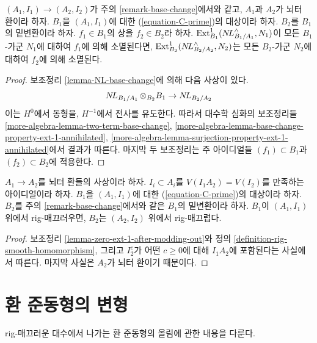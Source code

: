 \begin{lemma}
\label{lemma-zero-ext-1-after-modding-out}
$(A_1, I_1) \to (A_2, I_2)$가 주의 \ref{remark-base-change}에서와 같고,
$A_1$과 $A_2$가 뇌터 환이라 하자.
$B_1$을 $(A_1, I_1)$에 대한 (\ref{equation-C-prime})의 대상이라 하자.
$B_2$를 $B_1$의 밑변환이라 하자.
$f_1 \in B_1$의 상을 $f_2 \in B_2$라 하자.
$\mathop{\mathrm{Ext}}\nolimits^1_{B_1}(\mathop{N\!L}\nolimits_{B_1/A_1}^\wedge, N_1)$이 모든 $B_1$-가군 $N_1$에 대하여
$f_1$에 의해 소멸된다면,
$\mathop{\mathrm{Ext}}\nolimits^1_{B_2}(\mathop{N\!L}\nolimits_{B_2/A_2}^\wedge, N_2)$는 모든 $B_2$-가군 $N_2$에 대하여
$f_2$에 의해 소멸된다.
\end{lemma}

\begin{proof}
보조정리 \ref{lemma-NL-base-change}에 의해 다음 사상이 있다.
$$
\mathop{N\!L}\nolimits_{B_1/A_1} \otimes_{B_2} B_1 \to \mathop{N\!L}\nolimits_{B_2/A_2}
$$
이는 $H^0$에서 동형을, $H^{-1}$에서 전사를 유도한다.
따라서 대수학 심화의 보조정리들
\ref{more-algebra-lemma-two-term-base-change},
\ref{more-algebra-lemma-base-change-property-ext-1-annihilated},
\ref{more-algebra-lemma-surjection-property-ext-1-annihilated}에서 결과가 따른다.
마지막 두 보조정리는 주 아이디얼들 $(f_1) \subset B_1$과 $(f_2) \subset B_2$에 적용한다.
\end{proof}

\begin{lemma}
\label{lemma-base-change-rig-smooth-homomorphism}
$A_1 \to A_2$를 뇌터 환들의 사상이라 하자.
$I_i \subset A_i$를 $V(I_1A_2) = V(I_2)$를 만족하는 아이디얼이라 하자.
$B_1$을 $(A_1, I_1)$에 대한 (\ref{equation-C-prime})의 대상이라 하자.
$B_2$를 주의 \ref{remark-base-change}에서와 같은 $B_1$의 밑변환이라 하자.
$B_1$이 $(A_1, I_1)$ 위에서 rig-매끄러우면,
$B_2$는 $(A_2, I_2)$ 위에서 rig-매끄럽다.
\end{lemma}

\begin{proof}
보조정리 \ref{lemma-zero-ext-1-after-modding-out}와
정의 \ref{definition-rig-smooth-homomorphism}, 그리고
$I_2^c$가 어떤 $c \geq 0$에 대해 $I_1A_2$에 포함된다는 사실에서 따른다.
마지막 사실은 $A_2$가 뇌터 환이기 때문이다.
\end{proof}


\section{환 준동형의 변형}
\label{section-defos-ring-maps}

\noindent
rig-매끄러운 대수에서 나가는 환 준동형의 올림에 관한 내용을 다룬다.

